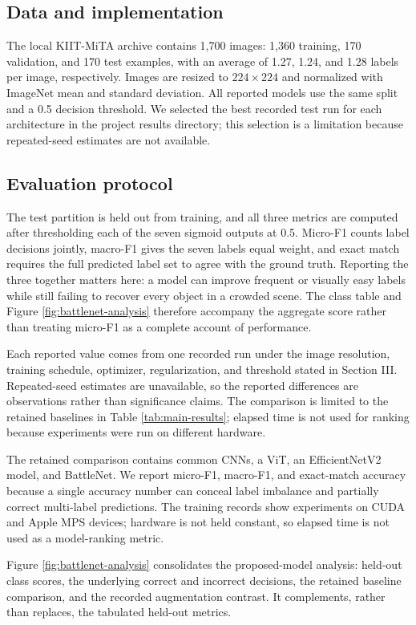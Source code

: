 \documentclass[conference]{IEEEtran}
\newcommand{\dataset}{KIIT-MiTA}
\begin{document}
\subsection{Data and implementation}
The local \dataset{} archive contains 1,700 images: 1,360 training, 170 validation, and 170 test examples, with an average of 1.27, 1.24, and 1.28 labels per image, respectively. Images are resized to $224\times224$ and normalized with ImageNet mean and standard deviation. All reported models use the same split and a 0.5 decision threshold. We selected the best recorded test run for each architecture in the project results directory; this selection is a limitation because repeated-seed estimates are not available.

\subsection{Evaluation protocol}
The test partition is held out from training, and all three metrics are computed after thresholding each of the seven sigmoid outputs at 0.5. Micro-F1 counts label decisions jointly, macro-F1 gives the seven labels equal weight, and exact match requires the full predicted label set to agree with the ground truth. Reporting the three together matters here: a model can improve frequent or visually easy labels while still failing to recover every object in a crowded scene. The class table and Figure \ref{fig:battlenet-analysis} therefore accompany the aggregate score rather than treating micro-F1 as a complete account of performance.

Each reported value comes from one recorded run under the image resolution, training schedule, optimizer, regularization, and threshold stated in Section III. Repeated-seed estimates are unavailable, so the reported differences are observations rather than significance claims. The comparison is limited to the retained baselines in Table \ref{tab:main-results}; elapsed time is not used for ranking because experiments were run on different hardware.

The retained comparison contains common CNNs, a ViT, an EfficientNetV2 model, and BattleNet. We report micro-F1, macro-F1, and exact-match accuracy because a single accuracy number can conceal label imbalance and partially correct multi-label predictions. The training records show experiments on CUDA and Apple MPS devices; hardware is not held constant, so elapsed time is not used as a model-ranking metric.

Figure \ref{fig:battlenet-analysis} consolidates the proposed-model analysis: held-out class scores, the underlying correct and incorrect decisions, the retained baseline comparison, and the recorded augmentation contrast. It complements, rather than replaces, the tabulated held-out metrics.
\end{document}
